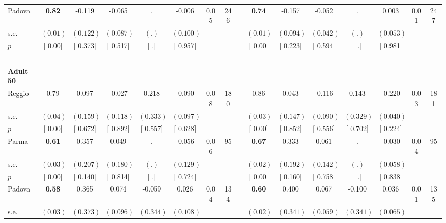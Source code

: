 \begin{longtable}{L{8em} c c c c c c c p{1em} c c c c c c c}
\quad \quad \quad Padova& \textbf{     0.82} &    -0.119 &    -0.065 &         . &    -0.006 &      0.05 &       246 & & \textbf{     0.74} &    -0.157 &    -0.052 &         . &     0.003 &      0.01 &       247  \\*
\quad \quad \quad \quad s.e.& $ (     0.01)$ & $ (    0.122)$ & $ (    0.087)$ & $ (        .)$ & $ (    0.100)$ & & & & $ (     0.01)$ & $ (    0.094)$ & $ (    0.042)$ & $ (        .)$ & $ (    0.053)$ & &  \\*
\quad \quad \quad \quad $ p$ & [     0.00] & [    0.373] & [    0.517] & [        .] & [    0.957] & & & & [     0.00] & [    0.223] & [    0.594] & [        .] & [    0.981] & &  \\[1em]
~\\[1em]
\quad \quad \textbf{Adult 50} & & & & & & & & & & & & & & & \\* 
\quad \quad \quad Reggio& 0.79 &     0.097 &    -0.027 &     0.218 &    -0.090 &      0.08 &       180 & & 0.86 &     0.043 &    -0.116 &     0.143 &    -0.220 &      0.03 &       181  \\*
\quad \quad \quad \quad s.e.& $ (     0.04)$ & $ (    0.159)$ & $ (    0.118)$ & $ (    0.333)$ & $ (    0.097)$ & & & & $ (     0.03)$ & $ (    0.147)$ & $ (    0.090)$ & $ (    0.329)$ & $ (    0.040)$ & &  \\*
\quad \quad \quad \quad $ p$ & [     0.00] & [    0.672] & [    0.892] & [    0.557] & [    0.628] & & & & [     0.00] & [    0.852] & [    0.556] & [    0.702] & [    0.224] & &  \\[1em]
\quad \quad \quad Parma& \textbf{     0.61} &     0.357 &     0.049 &         . &    -0.056 &      0.06 &        95 & & \textbf{     0.67} &     0.333 &     0.061 &         . &    -0.030 &      0.04 &        95  \\*
\quad \quad \quad \quad s.e.& $ (     0.03)$ & $ (    0.207)$ & $ (    0.180)$ & $ (        .)$ & $ (    0.129)$ & & & & $ (     0.02)$ & $ (    0.192)$ & $ (    0.142)$ & $ (        .)$ & $ (    0.058)$ & &  \\*
\quad \quad \quad \quad $ p$ & [     0.00] & [    0.140] & [    0.814] & [        .] & [    0.724] & & & & [     0.00] & [    0.160] & [    0.758] & [        .] & [    0.838] & &  \\[1em]
\quad \quad \quad Padova& \textbf{     0.58} &     0.365 &     0.074 &    -0.059 &     0.026 &      0.04 &       134 & & \textbf{     0.60} &     0.400 &     0.067 &    -0.100 &     0.036 &      0.01 &       135  \\*
\quad \quad \quad \quad s.e.& $ (     0.03)$ & $ (    0.373)$ & $ (    0.096)$ & $ (    0.344)$ & $ (    0.108)$ & & & & $ (     0.02)$ & $ (    0.341)$ & $ (    0.059)$ & $ (    0.341)$ & $ (    0.065)$ & &  \\*

\end{longtable}
